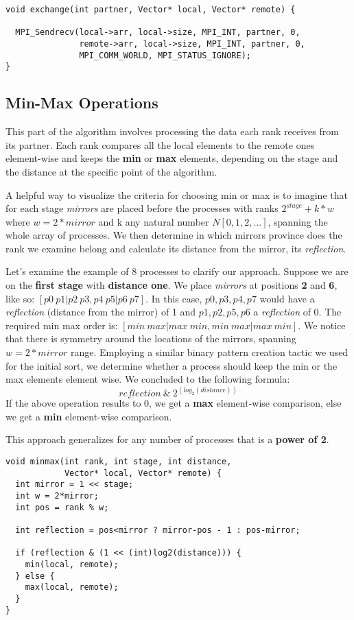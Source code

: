 \documentclass[12pt]{report}
\begin{document}
\begin{lstlisting}[style=cstyle]
void exchange(int partner, Vector* local, Vector* remote) {

  MPI_Sendrecv(local->arr, local->size, MPI_INT, partner, 0,
               remote->arr, local->size, MPI_INT, partner, 0,
               MPI_COMM_WORLD, MPI_STATUS_IGNORE);
}
\end{lstlisting}

\subsection{Min-Max Operations}

This part of the algorithm involves processing the data each rank receives from its partner.  Each rank compares all the local elements to the remote ones element-wise and keeps the \textbf{min} or \textbf{max} elements, depending on the stage and the distance at the specific point of the algorithm. 

A helpful way to visualize the criteria for choosing min or max is to imagine that for each stage \textit{mirrors} are placed before the processes with ranks $2^{stage} + k*w$ where $w=2*mirror$ and k any natural number $N[0,1,2,...]$, spanning the whole array of processes. We then determine in which mirrors province does the rank we examine belong and calculate its distance from the mirror, its \textit{reflection}.

Let's examine the example of 8 processes to clarify our approach. Suppose we are on the \textbf{first stage} with \textbf{distance one}. We place \textit{mirrors} at positions \textbf{2} and \textbf{6}, like so: $[p0\:p1|p2\:p3,p4\:p5|p6\:p7]$. In this case, $p0,p3,p4,p7$ would have a \textit{reflection} (distance from the mirror) of 1 and $p1,p2,p5,p6$ a \textit{reflection} of 0. The required min max order is: $[min\:max | max\:min, min\:max | max\:min]$.  We notice that there is symmetry around the locations of the mirrors, spanning $w=2*mirror$ range. Employing a similar binary pattern creation tactic we used for the initial sort, we determine whether a process should keep the min or the max elements element wise. We concluded to the following formula:
$$
reflection\:\&\: 2^{(log_2(distance))}
$$
If the above operation results to 0, we get a \textbf{max} element-wise comparison, else we get a \textbf{min} element-wise comparison.

This approach generalizes for any number of processes that is a \textbf{power of 2}.
\newpage
\begin{lstlisting}[style=cstyle]
void minmax(int rank, int stage, int distance, 
            Vector* local, Vector* remote) {
  int mirror = 1 << stage;
  int w = 2*mirror;
  int pos = rank % w;

  int reflection = pos<mirror ? mirror-pos - 1 : pos-mirror; 

  if (reflection & (1 << (int)log2(distance))) {
    min(local, remote);
  } else {
    max(local, remote);
  }
}
\end{lstlisting}
\end{document}
